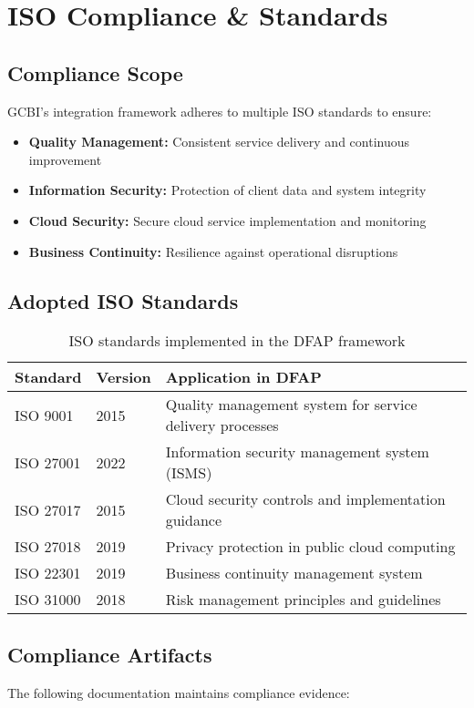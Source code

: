 \section{ISO Compliance \& Standards}

\subsection{Compliance Scope}
GCBI's integration framework adheres to multiple ISO standards to ensure:
\begin{itemize}
  \item \textbf{Quality Management:} Consistent service delivery and continuous improvement
  \item \textbf{Information Security:} Protection of client data and system integrity  
  \item \textbf{Cloud Security:} Secure cloud service implementation and monitoring
  \item \textbf{Business Continuity:} Resilience against operational disruptions
\end{itemize}

\subsection{Adopted ISO Standards}
\begin{table}[h]
\centering
\begin{tabular}{|l|l|p{6cm}|}
\hline
\textbf{Standard} & \textbf{Version} & \textbf{Application in DFAP} \\
\hline
ISO 9001 & 2015 & Quality management system for service delivery processes \\
\hline
ISO 27001 & 2022 & Information security management system (ISMS) \\
\hline
ISO 27017 & 2015 & Cloud security controls and implementation guidance \\
\hline
ISO 27018 & 2019 & Privacy protection in public cloud computing \\
\hline
ISO 22301 & 2019 & Business continuity management system \\
\hline
ISO 31000 & 2018 & Risk management principles and guidelines \\
\hline
\end{tabular}
\caption{ISO standards implemented in the DFAP framework}
\end{table}

\subsection{Compliance Artifacts}
The following documentation maintains compliance evidence:

